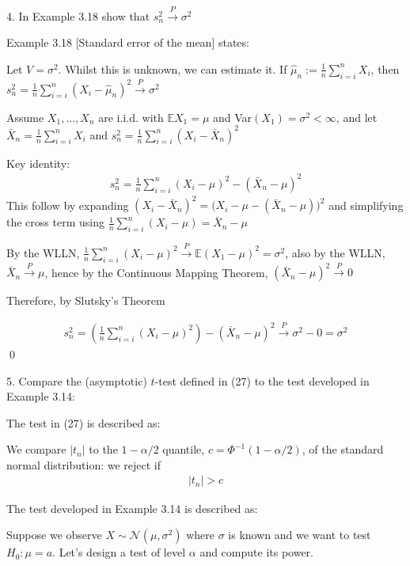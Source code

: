 \documentclass[10pt]{article}
\begin{document}
\newpage 

4. In Example 3.18 show that $s_n^2\xrightarrow{P}\sigma^2 $

Example 3.18 [Standard error of the mean] states: 

Let $V = \sigma^2 $. Whilst this is unknown, we can estimate it. If $\hat{\mu}_n := \frac{1}{n}\sum_{i = i}^{n}X_i $, then $s^2_n = \frac{1}{n}\sum_{i = i}^{n}(X_i - \hat{\mu}_n)^2 \xrightarrow{P}\sigma^2 $

Assume $X_1, …, X_n $ are i.i.d. with $\mathbb{E}X_1 = \mu $ and Var$(X_1) = \sigma^2 < \infty $, and let $\bar{X}_n = \frac{1}{n}\sum_{i = i}^{n}X_i $ and $ s_n^2 = \frac{1}{n}\sum_{i = i}^{n}(X_i - \bar{X}_n)^2 $

Key identity: 
\begin{gather*}
    s_n^2 = \frac{1}{n}\sum_{i = i}^{n}(X_i - \mu)^2 - (\bar{X}_n - \mu)^2
\end{gather*}
This follow by expanding $(X_i - \bar{X}_n)^2 = \big(X_i - \mu - (\bar{X}_n - \mu)\big)^2 $ and simplifying the cross term using $\frac{1}{n}\sum_{i = i}^{n}(X_i - \mu) = \bar{X}_n - \mu $

By the WLLN, $\frac{1}{n}\sum_{i = i}^{n}(X_i - \mu)^2 \xrightarrow{P} \mathbb{E}(X_1 - \mu)^2 = \sigma^2 $, also by the WLLN, $\bar{X}_n \xrightarrow{P}\mu $, hence by the Continuous Mapping Theorem, $(\bar{X}_n - \mu)^2 \xrightarrow{P}0 $

Therefore, by Slutsky's Theorem 

\begin{gather*}
    s_n^2 = \left(\frac{1}{n}\sum_{i = i}^{n}(X_i - \mu)^2\right) - (\bar{X}_n - \mu)^2 \xrightarrow{P}\sigma^2 - 0 = \sigma^2
\end{gather*}
\qed 

\hfill 

5. Compare the (asymptotic) $t $-test defined in (27) to the test developed in Example 3.14:

The test in (27) is described as: 

We compare $|t_n|$ to the $1 - \alpha / 2 $ quantile, $c = \Phi^{-1}(1 - \alpha / 2)$, of the standard normal distribution: we reject if 
\begin{gather*}
    |t_n| > c
\end{gather*}

The test developed in Example 3.14 is described as: 

Suppose we observe $X \sim \mathcal{N}(\mu, \sigma^2)$ where $\sigma $ is known and we want to test $H_0: \mu = a $. Let's design a test of level $\alpha $ and compute its power. 
\end{document}
